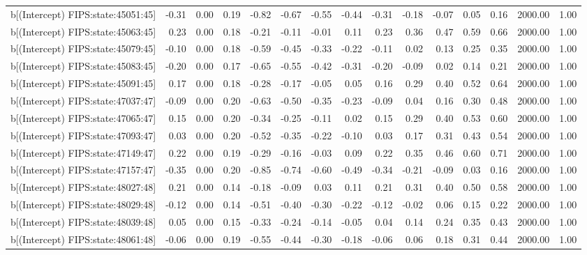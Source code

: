 \begin{table}[ht]
\begin{tabular}{rrrrrrrrrrrrrrr}
  b[(Intercept) FIPS:state:45051:45] & -0.31 & 0.00 & 0.19 & -0.82 & -0.67 & -0.55 & -0.44 & -0.31 & -0.18 & -0.07 & 0.05 & 0.16 & 2000.00 & 1.00 \\ 
  b[(Intercept) FIPS:state:45063:45] & 0.23 & 0.00 & 0.18 & -0.21 & -0.11 & -0.01 & 0.11 & 0.23 & 0.36 & 0.47 & 0.59 & 0.66 & 2000.00 & 1.00 \\ 
  b[(Intercept) FIPS:state:45079:45] & -0.10 & 0.00 & 0.18 & -0.59 & -0.45 & -0.33 & -0.22 & -0.11 & 0.02 & 0.13 & 0.25 & 0.35 & 2000.00 & 1.00 \\ 
  b[(Intercept) FIPS:state:45083:45] & -0.20 & 0.00 & 0.17 & -0.65 & -0.55 & -0.42 & -0.31 & -0.20 & -0.09 & 0.02 & 0.14 & 0.21 & 2000.00 & 1.00 \\ 
  b[(Intercept) FIPS:state:45091:45] & 0.17 & 0.00 & 0.18 & -0.28 & -0.17 & -0.05 & 0.05 & 0.16 & 0.29 & 0.40 & 0.52 & 0.64 & 2000.00 & 1.00 \\ 
  b[(Intercept) FIPS:state:47037:47] & -0.09 & 0.00 & 0.20 & -0.63 & -0.50 & -0.35 & -0.23 & -0.09 & 0.04 & 0.16 & 0.30 & 0.48 & 2000.00 & 1.00 \\ 
  b[(Intercept) FIPS:state:47065:47] & 0.15 & 0.00 & 0.20 & -0.34 & -0.25 & -0.11 & 0.02 & 0.15 & 0.29 & 0.40 & 0.53 & 0.60 & 2000.00 & 1.00 \\ 
  b[(Intercept) FIPS:state:47093:47] & 0.03 & 0.00 & 0.20 & -0.52 & -0.35 & -0.22 & -0.10 & 0.03 & 0.17 & 0.31 & 0.43 & 0.54 & 2000.00 & 1.00 \\ 
  b[(Intercept) FIPS:state:47149:47] & 0.22 & 0.00 & 0.19 & -0.29 & -0.16 & -0.03 & 0.09 & 0.22 & 0.35 & 0.46 & 0.60 & 0.71 & 2000.00 & 1.00 \\ 
  b[(Intercept) FIPS:state:47157:47] & -0.35 & 0.00 & 0.20 & -0.85 & -0.74 & -0.60 & -0.49 & -0.34 & -0.21 & -0.09 & 0.03 & 0.16 & 2000.00 & 1.00 \\ 
  b[(Intercept) FIPS:state:48027:48] & 0.21 & 0.00 & 0.14 & -0.18 & -0.09 & 0.03 & 0.11 & 0.21 & 0.31 & 0.40 & 0.50 & 0.58 & 2000.00 & 1.00 \\ 
  b[(Intercept) FIPS:state:48029:48] & -0.12 & 0.00 & 0.14 & -0.51 & -0.40 & -0.30 & -0.22 & -0.12 & -0.02 & 0.06 & 0.15 & 0.22 & 2000.00 & 1.00 \\ 
  b[(Intercept) FIPS:state:48039:48] & 0.05 & 0.00 & 0.15 & -0.33 & -0.24 & -0.14 & -0.05 & 0.04 & 0.14 & 0.24 & 0.35 & 0.43 & 2000.00 & 1.00 \\ 
  b[(Intercept) FIPS:state:48061:48] & -0.06 & 0.00 & 0.19 & -0.55 & -0.44 & -0.30 & -0.18 & -0.06 & 0.06 & 0.18 & 0.31 & 0.44 & 2000.00 & 1.00 \\ 

\end{tabular}
\end{table}

